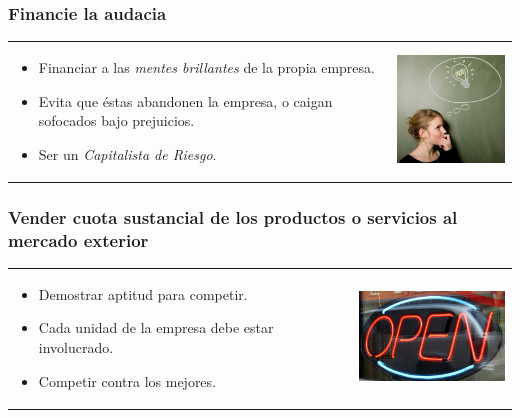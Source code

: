 \frame
{
\frametitle{Financie la audacia}
\begin{table}
\begin{tabular}{p{7cm}p{3cm}}
\begin{itemize}
    \item Financiar a las \textit{mentes brillantes} de la propia empresa.
    \item Evita que éstas abandonen la empresa, o caigan sofocados bajo
    prejuicios.
    \item Ser un \textit{Capitalista de Riesgo}.
\end{itemize}
&
\vspace{1.5cm}
\includegraphics[width=4cm]{img/creativegenius.jpg}\\
\end{tabular}
\end{table}
}
\frame
{
\frametitle{Vender cuota sustancial de los productos o servicios al mercado
exterior}
\begin{table}
\begin{tabular}{p{7cm}p{3cm}}
\begin{itemize}
    \item Demostrar aptitud para competir.
    \item Cada unidad de la empresa debe estar involucrado.
    \item Competir contra los mejores.
\end{itemize}
&
\vspace{1.5cm}
\includegraphics[width=4cm]{img/openbusiness.jpg}\\
\end{tabular}
\end{table}
}
\frame
